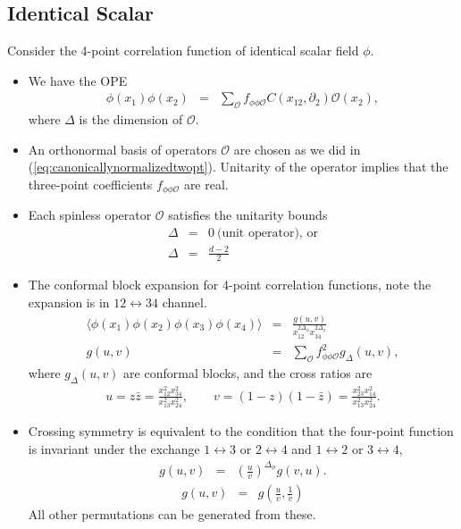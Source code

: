\documentclass[12pt]{article}
\numberwithin{equation}{section}
\newcommand\be{\begin{eqnarray}}
\newcommand\ee{\end{eqnarray}}
\newcommand\f\phi
\newcommand\cO{\mathcal{O}}
\newcommand\p[1]{\left(#1\right)}
\newcommand\ptl\partial
\newcommand\<\langle
\renewcommand\>\rangle
\newcommand\nn{\nonumber}
\renewcommand\.{\cdot}
\newcommand\x\times
\newcommand\De{\Delta}
\begin{document}
\subsection{Identical Scalar} 
Consider the 4-point correlation function of identical scalar field $\f$.
\begin{itemize}
\item We have the OPE
\be
\f(x_1)\f(x_2) &=& \sum_{\cO} f_{\f\f\cO} C(x_{12},\ptl_2) \cO(x_2),
\ee
where $\De$ is the dimension of $\cO$.

\item An orthonormal basis of operators $\cO$ are chosen as we did in (\ref{eq:canonicallynormalizedtwopt}).  Unitarity of the operator implies that the three-point coefficients $f_{\f\f\cO}$ are real.

\item Each spinless operator $\cO$ satisfies the unitarity bounds
\be
\label{eq:unitarityboundsummary}
\De &=& 0 \ \textrm{(unit operator), or}\nn\\
\De &=& \frac{d-2}{2}
\ee

\item The conformal block expansion for 4-point correlation functions, note the expansion is in $12\leftrightarrow34$ channel.
\be
\<\f(x_1)\f(x_2)\f(x_3)\f(x_4)\> &=& \frac{g(u,v)}{x_{12}^{2\De_\f}x_{34}^{2\De_\f}}\\
g(u,v) &=& \sum_\cO f_{\f\f\cO}^2 g_{\De}(u,v),
\ee
where $g_{\De}(u,v)$ are conformal blocks, and the cross ratios are
\be
u = z\bar z = \frac{x_{12}^2 x_{34}^2}{x_{13}^2 x_{24}^2},\qquad v=(1-z)(1-\bar z) =\frac{x_{23}^2 x_{14}^2}{x_{13}^2 x_{24}^2}.
\ee


\item Crossing symmetry is equivalent to the condition that the four-point function is invariant under the exchange $1\leftrightarrow 3$ or $2\leftrightarrow 4$ and $1\leftrightarrow2$ or $3\leftrightarrow4$,
\be
\label{eq:crossing1324}
g(u,v) &=& \p{\frac{u}{v}}^{\De_\f} g(v,u).
\ee
\be
\label{eq:crossing1234}
g(u,v) &=& g(\frac u v,\frac 1 v)
\ee
All other permutations can be generated from these.

\end{itemize}

\end{document}
